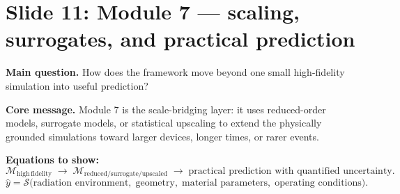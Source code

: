 \documentclass[11pt]{article}
\begin{document}
\section{Slide 11: Module 7 --- scaling, surrogates, and practical prediction}
\begin{physicsbox}
\textbf{Main question.} How does the framework move beyond one small high-fidelity simulation into useful prediction?
\end{physicsbox}

\textbf{Core message.} Module 7 is the scale-bridging layer: it uses reduced-order models, surrogate models, or statistical upscaling to extend the physically grounded simulations toward larger devices, longer times, or rarer events.

\textbf{Equations to show:}
\begin{equation*}
\mathcal{M}_{\mathrm{high\,fidelity}}
\;\longrightarrow\;
\mathcal{M}_{\mathrm{reduced/surrogate/upscaled}}
\;\longrightarrow\;
\text{practical prediction with quantified uncertainty}.
\end{equation*}
\begin{equation*}
\hat{y}=\mathcal{S}\!\bigl(\text{radiation environment},\; \text{geometry},\; \text{material parameters},\; \text{operating conditions}\bigr).
\end{equation*}
\end{document}
